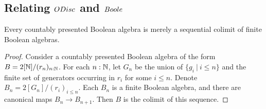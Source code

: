 \subsection{Relating $\ODisc$ and $\Boole$}
\begin{lemma}\label{BooleIsODisc}
  Every countably presented Boolean algebra is merely a sequential colimit of finite Boolean algebras. 
\end{lemma}
\begin{proof}
  Consider a countably presented Boolean algebra of the form $B = 2[\mathbb{N}]/(r_n)_{n:\mathbb{N}}$. 
  For each $n:\mathbb{N}$, let $G_n$ be the union of $\{g_i\ |\ {i\leq n}\}$ and 
  the finite set of generators occurring in $r_i$ for some $i\leq n$. 
  Denote $B_n = 2[G_n]/(r_i)_{i\leq n}$. 
  Each $B_n$ is a finite Boolean algebra, and there are canonical maps $B_n \to B_{n+1}$.
  Then $B$ is the colimit of this sequence. 
%
%
\end{proof}




